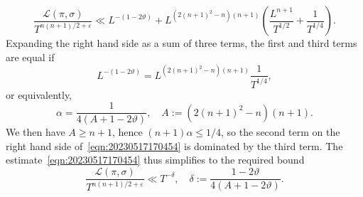 \documentclass[reqno]{amsart}
\def\eps{\varepsilon}
\theoremstyle{plain} \newtheorem{theorem} {Theorem} \newtheorem{conjecture} {Conjecture} \newtheorem{corollary} [theorem] {Corollary} \newtheorem{proposition} [theorem] {Proposition} \newtheorem{fact} [theorem] {Fact}
\theoremstyle{definition} \newtheorem{definition} [theorem] {Definition}
\theoremstyle{itplain} %
\begin{document}
\begin{equation}\label{eqn:20230517170454}
  \frac{\mathcal{L}(\pi,\sigma)}{ T^{n (n + 1 )/2 + \eps }}
  \ll
  L^{-(1 - 2 \vartheta )} + L^{(2 {(n + 1 )}^2 - n ) (n+1)} \left( \frac{L^{n+1}}{ T^{1/2} }
    + \frac{1}{T^{1/4} }\right).
\end{equation}
Expanding the right hand side as a sum of three terms, the first and third terms are equal if
\begin{equation*}
  L^{- (1 - 2 \vartheta )}
  =
  L^{(2 {(n + 1 )}^2 - n ) (n+1)}
  \frac{1}{T^{1/4} },
\end{equation*}
or equivalently,
\begin{equation*}
  \alpha = \frac{1}{4 ( A + 1 - 2 \vartheta)}, \quad A := (2 {(n + 1 )}^2 - n ) (n + 1).
\end{equation*}
We then have $A \geq n+1$, hence $(n+1) \alpha \leq 1/4$, so the second term on the right hand side of~\eqref{eqn:20230517170454} is dominated by the third term.  The estimate~\eqref{eqn:20230517170454} thus simplifies to the required bound
\begin{equation*}
  \frac{\mathcal{L}(\pi,\sigma)}{ T^{n (n + 1 )/2 + \eps }}
  \ll
  T^{-\delta}, \quad
  \delta := \frac{1 - 2 \vartheta }{4 (A + 1 - 2 \vartheta )}.
\end{equation*}
\end{document}

